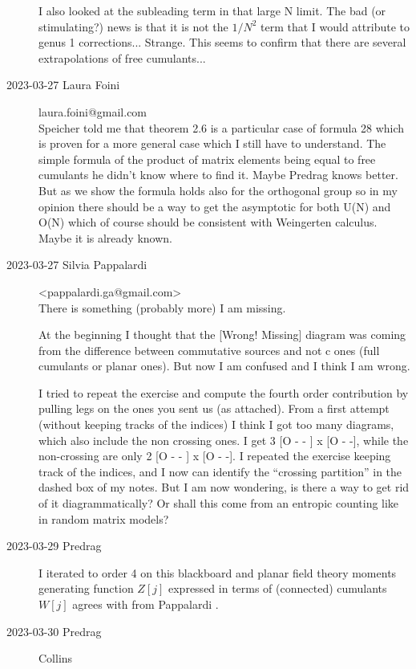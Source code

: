 \begin{description}
I also looked at the subleading term in that large N limit. The bad (or
stimulating?) news is that it is not the $1/N^2$ term that I would
attribute to genus 1 corrections... Strange. This seems to confirm that
there are several extrapolations of free cumulants...

   \item[2023-03-27 Laura Foini]  laura.foini@gmail.com\\
Speicher told me that theorem 2.6 is a particular case of formula 28
which is proven for a more general case which I still have to understand.
The simple formula of the product of matrix elements being equal to free
cumulants he didn't know where to find it.
Maybe Predrag knows better.
But as we show the formula holds also for the orthogonal group so in my
opinion there should be a way to get the asymptotic for both U(N) and
O(N) which of course should be consistent with Weingerten calculus. Maybe
it is already known.

   \item[2023-03-27 Silvia Pappalardi] <pappalardi.ga@gmail.com>\\
There is something (probably more) I am missing.

At the beginning I thought that the [Wrong! Missing] diagram was coming from
the difference between commutative sources and not c ones (full cumulants or
planar ones). But now I am confused and I think I am wrong.

I tried to repeat the exercise and compute the fourth order contribution by
pulling legs on the ones you sent us (as attached). From a first attempt
(without keeping tracks of the indices) I think I got too many diagrams,
which also include the non crossing ones. I get 3  [O - - ] x [O - -], while
the non-crossing are only 2  [O - - ] x [O - -]. I repeated the exercise
keeping track of the indices, and I now can identify the ``crossing partition''
in the dashed box of my notes. But I am now wondering, is there a way to get
rid of it diagrammatically? Or shall this come from an entropic counting like
in random matrix models?

   \item[2023-03-29 Predrag]
I iterated  to order 4 on this
 {blackboard}
and planar field theory moments generating function $Z[j]$ expressed in
terms of (connected) cumulants $W[j]$ agrees with 
from Pappalardi \etal{}.


   \item[2023-03-30 Predrag]  Collins \etal{}\\


\end{description}
